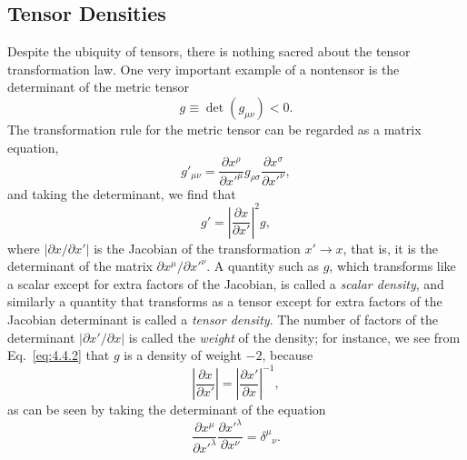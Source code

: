 
\subsection{Tensor Densities}\label{sec:4.4}

Despite the ubiquity of tensors, there is nothing sacred about the tensor
transformation law. One very important example of a nontensor is the
determinant of the metric tensor
\begin{equation}
  g\equiv\det(g_{\mu\nu})<0.
  \tag{4.4.1}\label{eq:4.4.1}
\end{equation}
The transformation rule for the metric tensor can be regarded as a matrix
equation,
\[
  g'_{\mu\nu}
  =
  \frac{\partial x^\rho}{\partial x'^\mu}
  g_{\rho\sigma}
  \frac{\partial x^\sigma}{\partial x'^\nu},
\]
and taking the determinant, we find that
\begin{equation}
  g'
  =
  \left\lvert\frac{\partial x}{\partial x'}\right\rvert^2 g,
  \tag{4.4.2}\label{eq:4.4.2}
\end{equation}
where \(\lvert\partial x/\partial x'\rvert\) is the Jacobian of the
transformation \(x'\to x\), that is, it is the determinant of the matrix
\(\partial x^\mu/\partial x'^\nu\). A quantity such as \(g\), which
transforms like a scalar except for extra factors of the Jacobian, is called
a \textit{scalar density}, and similarly a quantity that transforms as a
tensor except for extra factors of the Jacobian determinant is called a
\textit{tensor density}. The number of factors of the determinant
\(\lvert\partial x'/\partial x\rvert\) is called the \textit{weight} of the
density; for instance, we see from Eq.~\eqref{eq:4.4.2} that \(g\) is a
density of weight \(-2\), because
\begin{equation}
  \left\lvert\frac{\partial x}{\partial x'}\right\rvert
  =
  \left\lvert\frac{\partial x'}{\partial x}\right\rvert^{-1},
  \tag{4.4.3}\label{eq:4.4.3}
\end{equation}
as can be seen by taking the determinant of the equation
\[
  \frac{\partial x^\mu}{\partial x'^\lambda}
  \frac{\partial x'^\lambda}{\partial x^\nu}
  =\delta^\mu{}_\nu.
\]

